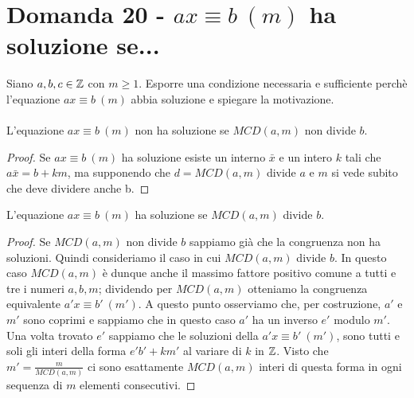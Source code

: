 \documentclass[]{article}
\begin{document}
\section{Domanda 20 - $ax \equiv b\ (m)$ ha soluzione se...}
Siano $a,b,c \in \mathbb{Z}$ con $m \geq 1$. Esporre una condizione necessaria e sufficiente perchè l'equazione $ax \equiv b \ (m) $ abbia soluzione e spiegare la motivazione.
\\ \\
L'equazione $ax \equiv b\ (m)$ non ha soluzione se $MCD(a, m)$ non divide $b$.
\begin{proof}
Se $ax \equiv b\ (m)$ ha soluzione esiste un interno $\bar{x}$ e un intero $k$ tali che $a\bar{x} = b + km$, ma supponendo che $d=MCD(a,m)$ divide $a$ e $m$ si vede subito che deve dividere anche b.
\end{proof}
L'equazione $ax \equiv b\ (m)$ ha soluzione se $MCD(a, m)$ divide $b$.
\begin{proof}
Se $MCD(a, m)$ non divide $b$ sappiamo già che la congruenza non ha soluzioni. Quindi consideriamo il caso in cui $MCD(a, m)$ divide $b$. In questo caso $MCD(a,m)$ è dunque anche il massimo fattore positivo comune a tutti e tre i numeri $a, b, m$; dividendo per $MCD(a,m)$ otteniamo la congruenza equivalente $a'x \equiv b' \  (m')$. A questo punto osserviamo che, per costruzione, $a'$ e $m'$ sono coprimi e sappiamo che in questo caso $a'$ ha un inverso $e'$ modulo $m'$. Una volta trovato $e'$ sappiamo che le soluzioni della  $a'x \equiv b' \  (m')$, sono tutti e soli gli interi della forma $e'b'+km'$ al variare di $k$ in $\mathbb{Z}$. Visto che $m' = \frac{m}{MCD(a, m)}$ ci sono esattamente $MCD(a,m)$ interi di questa forma in ogni sequenza di $m$ elementi consecutivi.
\end{proof}
\end{document}
